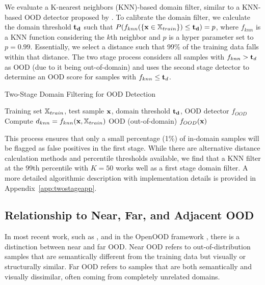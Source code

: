 \documentclass[11pt, oneside]{book}
\theoremstyle{plain}
\theoremstyle{definition}
\theoremstyle{remark}
\begin{document}
We evaluate a K-nearest neighbors (KNN)-based domain filter, similar to a KNN-based OOD detector proposed by \citet{sun2022out}. To calibrate the domain filter, we calculate the domain threshold ${\mathbf{t}}_{\mathbf{d}}$ such that $P(f_{knn}(\{{\mathbf{x}} \in {\mathbb{X}}_{train}\}) \leq {\mathbf{t}}_{\mathbf{d}}) = p$, where $f_{knn}$ is a KNN function considering the $k$th neighbor and $p$ is a hyper parameter set to $p = 0.99$. Essentially, we select a distance such that 99\% of the training data falls within that distance. The two stage process considers all samples with $f_{knn} > {\mathbf{t}}_d$ as OOD (due to it being out-of-domain) and uses the second stage detector to determine an OOD score for samples with $f_{knn} \leq {\mathbf{t}}_d$.

\begin{algorithm}
\caption{Two-Stage Domain Filtering for OOD Detection}
\label{alg:domainfiltering}
\begin{algorithmic}[1]
\Require Training set ${\mathbb{X}}_{train}$, test sample ${\mathbf{x}}$, domain threshold ${\mathbf{t}}_{\mathbf{d}}$, OOD detector $f_{OOD}$
\State Compute $d_{knn} = f_{knn}({\mathbf{x}}, {\mathbb{X}}_{train})$ 
    \State \Return OOD (out-of-domain)
\Else
    \State \Return $f_{OOD}({\mathbf{x}})$ 
\EndIf
\end{algorithmic}
\end{algorithm}

This process ensures that only a small percentage (1\%) of in-domain samples will be flagged as false positives in the first stage. While there are alternative distance calculation methods and percentile thresholds available, we find that a KNN filter at the 99th percentile with $K = 50$ works well as a first stage domain filter. A more detailed algorithmic description with implementation details is provided in Appendix~\ref{app:twostageapp}.

\subsection{Relationship to Near, Far, and Adjacent OOD}

In most recent work, such as \citet{fort2021exploring}, and in the OpenOOD framework \citep{yang2022openood, zhang2023openood}, there is a distinction between near and far OOD. Near OOD refers to out-of-distribution samples that are semantically different from the training data but visually or structurally similar. Far OOD refers to samples that are both semantically and visually dissimilar, often coming from completely unrelated domains.
\end{document}
